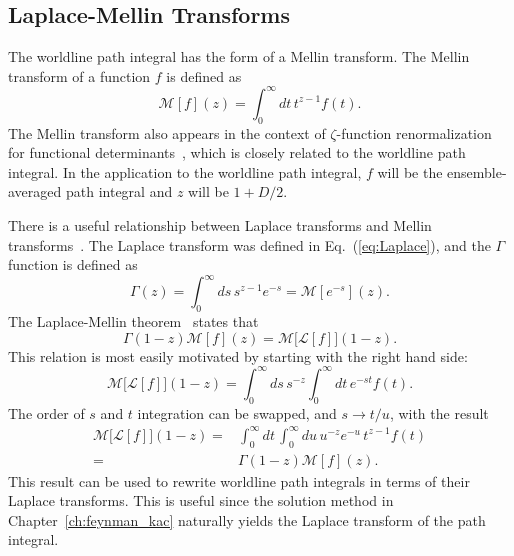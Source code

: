 \subsection{ Laplace-Mellin Transforms}

The worldline path integral has the form of a Mellin transform.  
The Mellin transform of a function $f$ is defined as 
\begin{equation}
\mathcal{M}[f](z)= \int_0^\infty dt\, t^{z-1}f(t).
\end{equation}
The Mellin transform also appears in the context of $\zeta$-function renormalization for functional determinants~\cite{Elizalde2008},
which is closely related to the worldline path integral.  
In the application to the worldline path integral, $f$ will be the ensemble-averaged path integral and $z$ will be $1+D/2$.

There is a useful relationship between Laplace transforms and Mellin transforms~\cite{Lew1975}.  
The Laplace transform was defined in Eq.~(\ref{eq:Laplace}), and the $\Gamma$ function is defined as  
\begin{equation}
\Gamma(z) = \int_0^\infty ds\, s^{z-1} e^{-s} = \mathcal{M}[e^{-s}](z).
\end{equation}
The Laplace-Mellin theorem~\cite{Lew1975} states that
\begin{equation}
  \Gamma(1-z)\mathcal{M}[f](z) = \mathcal{M}\big[\mathcal{L}[f]\big](1-z)\label{eq:Laplace-Mellin}.
\end{equation}
This relation is most easily motivated by starting with the right hand side:
\begin{equation}
\mathcal{M}\big[\mathcal{L}[f]\big](1-z) = 
\int_0^\infty ds\, s^{-z} \int_0^\infty dt\,e^{-st} f(t).
\end{equation}
The order of $s$ and $t$ integration can be swapped, and  $s\rightarrow t/u$, with the 
result
\begin{align}
\mathcal{M}\big[\mathcal{L}[f]\big](1-z)=&\int_0^\infty dt\,\int_0^\infty du\, u^{-z} e^{-u}\,t^{z-1} f(t) \\
=& \Gamma(1-z)\mathcal{M}[f](z).
\end{align}
This result can be used to rewrite worldline path integrals in terms of their Laplace transforms. 
This is useful since the solution method in Chapter~\ref{ch:feynman_kac} naturally yields the Laplace transform of the path integral.

